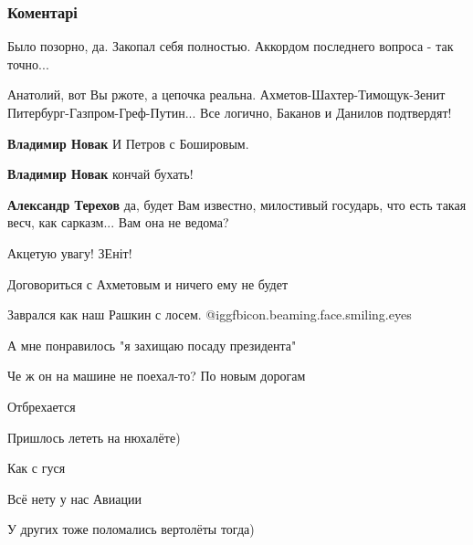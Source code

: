  
 
 
 
 
\subsubsection{Коментарі}
\label{sec:26_11_2021.fb.sharij_anatolij.1.konec_imperatora.cmt}

\begin{itemize} %
Было позорно, да. Закопал себя полностью. Аккордом последнего вопроса - так точно...


Анатолий, вот Вы ржоте, а цепочка реальна. Ахметов-Шахтер-Тимощук-Зенит
Питербург-Газпром-Греф-Путин... Все логично, Баканов и Данилов подтвердят!

\begin{itemize} %
\textbf{Владимир Новак} И Петров с Бошировым.

\textbf{Владимир Новак} кончай бухать!

\textbf{Александр Терехов} да, будет Вам известно, милостивый государь, что есть такая весч, как сарказм... Вам она не ведома?

Акцетую увагу! ЗЕніт!
\end{itemize} %

Договориться с Ахметовым и ничего ему не будет

Заврался как наш Рашкин с лосем.  @igg{fbicon.beaming.face.smiling.eyes} 

А мне понравилось "я захищаю посаду президента"

Че ж он на машине не поехал-то? По новым дорогам

Отбрехается

Пришлось лететь на нюхалёте)

Как с гуся

Всё нету у нас Авиации

У других тоже поломались вертолёты тогда)


\end{itemize}
